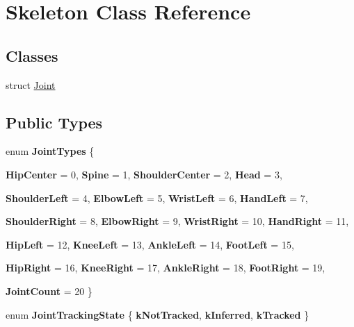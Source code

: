 \hypertarget{classSkeleton}{
\section{Skeleton Class Reference}
\label{classSkeleton}
}
\subsection*{Classes}
\begin{DoxyCompactItemize}
\item 
struct \hyperlink{structSkeleton_1_1Joint}{Joint}
\end{DoxyCompactItemize}
\subsection*{Public Types}
\begin{DoxyCompactItemize}
\item 
enum {\bfseries JointTypes} \{ \par
{\bfseries HipCenter} =  0, 
{\bfseries Spine} =  1, 
{\bfseries ShoulderCenter} =  2, 
{\bfseries Head} =  3, 
\par
{\bfseries ShoulderLeft} =  4, 
{\bfseries ElbowLeft} =  5, 
{\bfseries WristLeft} =  6, 
{\bfseries HandLeft} =  7, 
\par
{\bfseries ShoulderRight} =  8, 
{\bfseries ElbowRight} =  9, 
{\bfseries WristRight} =  10, 
{\bfseries HandRight} =  11, 
\par
{\bfseries HipLeft} =  12, 
{\bfseries KneeLeft} =  13, 
{\bfseries AnkleLeft} =  14, 
{\bfseries FootLeft} =  15, 
\par
{\bfseries HipRight} =  16, 
{\bfseries KneeRight} =  17, 
{\bfseries AnkleRight} =  18, 
{\bfseries FootRight} =  19, 
\par
{\bfseries JointCount} =  20
 \}
\item 
enum {\bfseries JointTrackingState} \{ {\bfseries kNotTracked}, 
{\bfseries kInferred}, 
{\bfseries kTracked}
 \}
\end{DoxyCompactItemize}
